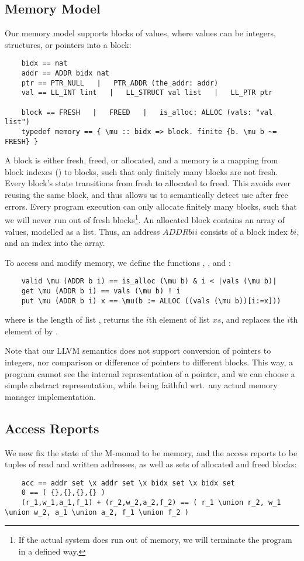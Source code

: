 \documentclass[sn-mathphys,Numbered]{sn-jnl}
\theoremstyle{thmstyleone}%
\theoremstyle{definition}%
\theoremstyle{thmstylethree}%
\begin{document}
  \subsection{Memory Model}
  Our memory model supports blocks of values, where values can be integers, structures, or pointers into a block:
  \begin{lstlisting}
    bidx == nat
    addr == ADDR bidx nat
    ptr == PTR_NULL   |   PTR_ADDR (the_addr: addr)
    val == LL_INT lint   |   LL_STRUCT val list   |   LL_PTR ptr

    block == FRESH   |   FREED   |   is_alloc: ALLOC (vals: "val list")
    typedef memory == { \mu :: bidx => block. finite {b. \mu b ~= FRESH} }
  \end{lstlisting}
  A block is either fresh, freed, or allocated, and a memory is a mapping from block indexes () to blocks,
  such that only finitely many blocks are not fresh. Every block's state transitions from fresh to
  allocated to freed. This avoids ever reusing the same block, and thus allows us to semantically detect use after free errors.
  Every program execution can only allocate finitely many blocks,
  such that we will never run out of fresh blocks\footnote{If the actual system does run out of memory, we will terminate the program in a defined way.}.
  An allocated block contains an array of values, modelled as a list. Thus, an address \is$ADDR bi i$ consists of a block index \is$bi$, and an index  into the array.

  To access and modify memory, we define the functions , , and :
  \begin{lstlisting}
    valid \mu (ADDR b i) == is_alloc (\mu b) & i < |vals (\mu b)|
    get \mu (ADDR b i) == vals (\mu b) ! i
    put \mu (ADDR b i) x == \mu(b := ALLOC ((vals (\mu b))[i:=x]))
  \end{lstlisting}
  where  is the length of list ,  returns the \is$i$th element of list \is$xs$,
  and  replaces the \is$i$th element of  by .

  Note that our LLVM semantics does not support conversion of pointers to integers, nor comparison
  or difference of pointers to different blocks. This way, a program cannot see the internal representation of a pointer,
  and we can choose a simple abstract representation, while being
  faithful wrt.\ any actual memory manager implementation.

  \subsection{Access Reports}
  We now fix the state of the M-monad to be memory, and the access reports to be tuples  of
  read and written addresses, as well as sets of allocated and freed blocks:
  \begin{lstlisting}
    acc == addr set \x addr set \x bidx set \x bidx set
    0 == ( {},{},{},{} )
    (r_1,w_1,a_1,f_1) + (r_2,w_2,a_2,f_2) == ( r_1 \union r_2, w_1 \union w_2, a_1 \union a_2, f_1 \union f_2 )
  \end{lstlisting}
\end{document}

